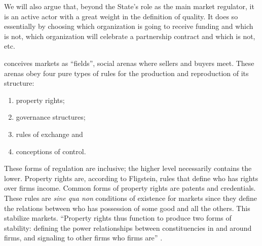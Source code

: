 \documentclass[a4paper, 12pt, openright, oneside, german, french, brazil, english]{abntex2}
\begin{document}
        We will also argue that, beyond the State's role as the main market regulator, it is an active actor with a great weight in the definition of quality. It does so essentially by choosing which organization is going to receive funding and which is not, which organization will celebrate a partnership contract and which is not, etc.
	
	
	 conceives markets as ``fields'', social arenas where sellers and buyers meet. These arenas obey four pure types of rules for the production and reproduction of its structure:
	
	\begin{enumerate}
		\item property rights;
		\item governance structures;
		\item rules of exchange and
		\item conceptions of control.
	\end{enumerate}
	
	
		
	
	These forms of regulation are inclusive; the higher level necessarily contains the lower. Property rights are, according to Fligstein, rules that define who has rights over firms income. Common forms of property rights are patents and credentials. These rules are \textit{sine qua non} conditions of existence for markets since they define the relations between who has possession of some good and all the others. This stabilize markets. ``Property rights thus function to produce two forms of stability: defining the power relationships between constituencies in and around firms, and signaling to other firms who firms are'' \cite[p. 34]{fligstein2002architecture}.
	
\end{document}
